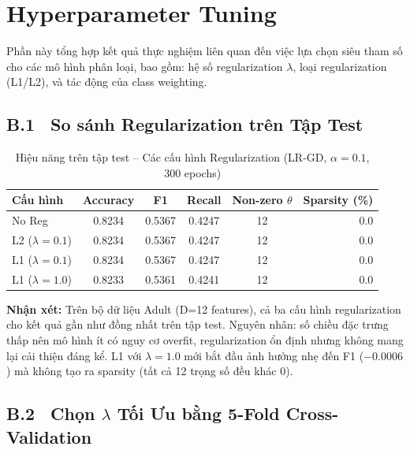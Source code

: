\documentclass[12pt, a4paper]{article}
\begin{document}
\section{Hyperparameter Tuning}
\label{app:hparam}

Phần này tổng hợp kết quả thực nghiệm liên quan đến việc lựa chọn siêu tham số
cho các mô hình phân loại, bao gồm: hệ số regularization $\lambda$, loại
regularization (L1/L2), và tác động của class weighting.

\subsection*{B.1 \ So sánh Regularization trên Tập Test}

\begin{table}[H]
  \centering
  \caption{Hiệu năng trên tập test -- Các cấu hình Regularization (LR-GD, $\alpha=0.1$, 300 epochs)}
  \label{tab:reg_test}
  \begin{tabular}{lccccr}
    \toprule
    \textbf{Cấu hình} & \textbf{Accuracy} & \textbf{F1} & \textbf{Recall} & \textbf{Non-zero $\theta$} & \textbf{Sparsity (\%)} \\
    \midrule
    No Reg              & 0.8234 & 0.5367 & 0.4247 & 12 & 0.0 \\
    L2 ($\lambda=0.1$)  & 0.8234 & 0.5367 & 0.4247 & 12 & 0.0 \\
    L1 ($\lambda=0.1$)  & 0.8234 & 0.5367 & 0.4247 & 12 & 0.0 \\
    L1 ($\lambda=1.0$)  & 0.8233 & 0.5361 & 0.4241 & 12 & 0.0 \\
    \bottomrule
  \end{tabular}
\end{table}

\noindent\textbf{Nhận xét:}
Trên bộ dữ liệu Adult (D=12 features), cả ba cấu hình regularization cho kết quả
gần như đồng nhất trên tập test. Nguyên nhân: số chiều đặc trưng thấp nên mô hình
ít có nguy cơ overfit, regularization ổn định nhưng không mang lại cải thiện đáng
kể. L1 với $\lambda=1.0$ mới bắt đầu ảnh hưởng nhẹ đến F1 ($-0.0006$) mà không
tạo ra sparsity (tất cả 12 trọng số đều khác 0).

\subsection*{B.2 \ Chọn $\lambda$ Tối Ưu bằng 5-Fold Cross-Validation}
\end{document}
